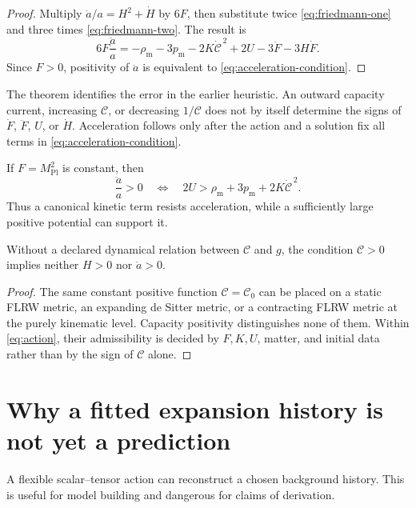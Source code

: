 \documentclass[11pt]{article}
\newcommand{\CC}{\mathcal C}
\newcommand{\mpl}{M_{\mathrm{Pl}}}
\begin{document}
\begin{proof}
Multiply $\ddot a/a=H^2+\dot H$ by $6F$, then substitute twice
\cref{eq:friedmann-one} and three times
\cref{eq:friedmann-two}.  The result is
\[
 6F\frac{\ddot a}{a}
 =
 -\rho_{\mathrm m}-3p_{\mathrm m}
 -2K\dot{\CC}^{\,2}
 +2U-3\ddot F-3H\dot F.
\]
Since $F>0$, positivity of $\ddot a$ is equivalent to
\cref{eq:acceleration-condition}.
\end{proof}

The theorem identifies the error in the earlier heuristic.  An outward
capacity current, increasing $\CC$, or decreasing $1/\CC$ does not by
itself determine the signs of $\dot F$, $\ddot F$, $U$, or $\dot H$.
Acceleration follows only after the action and a solution fix all terms
in \cref{eq:acceleration-condition}.

\begin{corollary}
If $F=\mpl^2$ is constant, then
\[
 \frac{\ddot a}{a}>0
 \quad\Longleftrightarrow\quad
 2U>\rho_{\mathrm m}+3p_{\mathrm m}
       +2K\dot{\CC}^{\,2}.
\]
Thus a canonical kinetic term resists acceleration, while a sufficiently
large positive potential can support it.
\end{corollary}

\begin{proposition}
\label{prop:no-expansion}
Without a declared dynamical relation between $\CC$ and $g$, the
condition $\CC>0$ implies neither $H>0$ nor $\ddot a>0$.
\end{proposition}

\begin{proof}
The same constant positive function $\CC=\CC_0$ can be placed on a static
FLRW metric, an expanding de Sitter metric, or a contracting FLRW metric
at the purely kinematic level.  Capacity positivity distinguishes none
of them.  Within \cref{eq:action}, their admissibility is decided by
$F,K,U$, matter, and initial data rather than by the sign of $\CC$ alone.
\end{proof}

\section{Why a fitted expansion history is not yet a prediction}

A flexible scalar--tensor action can reconstruct a chosen background
history.  This is useful for model building and dangerous for claims of
derivation.
\end{document}
